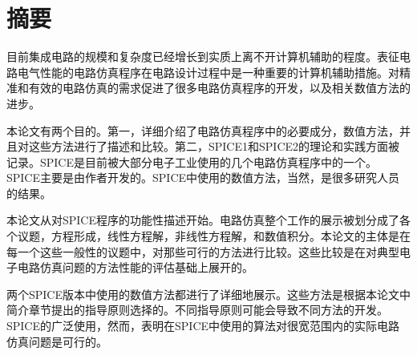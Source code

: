 \chapter*{摘要}
目前集成电路的规模和复杂度已经增长到实质上离不开计算机辅助的程度。表征电路电气性能的电路仿真程序在电路设计过程中是一种重要的计算机辅助措施。对精准和有效的电路仿真的需求促进了很多电路仿真程序的开发，以及相关数值方法的进步。

本论文有两个目的。第一，详细介绍了电路仿真程序中的必要成分，数值方法，并且对这些方法进行了描述和比较。第二，SPICE1和SPICE2的理论和实践方面被记录。SPICE是目前被大部分电子工业使用的几个电路仿真程序中的一个。SPICE主要是由作者开发的。SPICE中使用的数值方法，当然，是很多研究人员的结果。

本论文从对SPICE程序的功能性描述开始。电路仿真整个工作的展示被划分成了各个议题，方程形成，线性方程解，非线性方程解，和数值积分。本论文的主体是在每一个这些一般性的议题中，对那些可行的方法进行比较。这些比较是在对典型电子电路仿真问题的方法性能的评估基础上展开的。

两个SPICE版本中使用的数值方法都进行了详细地展示。这些方法是根据本论文中简介章节提出的指导原则选择的。不同指导原则可能会导致不同方法的开发。SPICE的广泛使用，然而，表明在SPICE中使用的算法对很宽范围内的实际电路仿真问题是可行的。
